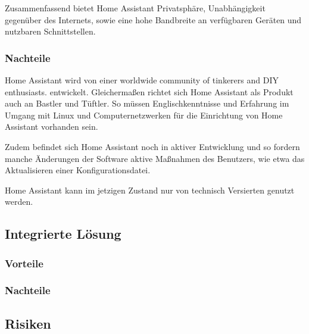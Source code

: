 Zusammenfassend bietet Home Assistant Privatsphäre, Unabhängigkeit gegenüber des Internets, sowie eine hohe Bandbreite an verfügbaren Geräten und nutzbaren Schnittstellen.

\subsubsection{Nachteile}

Home Assistant wird von einer \glqq worldwide community of tinkerers and DIY enthusiasts.\grqq{} entwickelt.
Gleichermaßen richtet sich Home Assistant als Produkt auch an Bastler und Tüftler.
So müssen Englischkenntnisse und Erfahrung im Umgang mit Linux und Computernetzwerken für die Einrichtung von Home Assistant vorhanden sein.

Zudem befindet sich Home Assistant noch in aktiver Entwicklung und so fordern manche Änderungen der Software aktive Maßnahmen des Benutzers, wie etwa das Aktualisieren einer Konfigurationsdatei.

Home Assistant kann im jetzigen Zustand nur von technisch Versierten genutzt werden.

\subsection{Integrierte Lösung} %


\subsubsection{Vorteile}

\subsubsection{Nachteile}

\subsection{Risiken}


